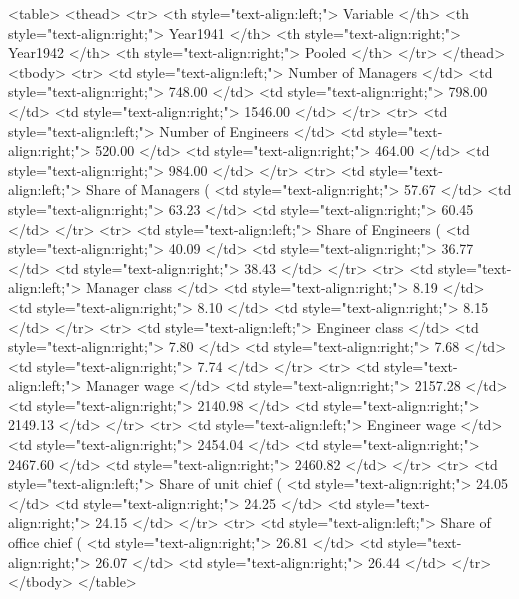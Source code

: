 <table>
 <thead>
  <tr>
   <th style="text-align:left;"> Variable </th>
   <th style="text-align:right;"> Year1941 </th>
   <th style="text-align:right;"> Year1942 </th>
   <th style="text-align:right;"> Pooled </th>
  </tr>
 </thead>
<tbody>
  <tr>
   <td style="text-align:left;"> Number of Managers </td>
   <td style="text-align:right;"> 748.00 </td>
   <td style="text-align:right;"> 798.00 </td>
   <td style="text-align:right;"> 1546.00 </td>
  </tr>
  <tr>
   <td style="text-align:left;"> Number of Engineers </td>
   <td style="text-align:right;"> 520.00 </td>
   <td style="text-align:right;"> 464.00 </td>
   <td style="text-align:right;"> 984.00 </td>
  </tr>
  <tr>
   <td style="text-align:left;"> Share of Managers (%
   <td style="text-align:right;"> 57.67 </td>
   <td style="text-align:right;"> 63.23 </td>
   <td style="text-align:right;"> 60.45 </td>
  </tr>
  <tr>
   <td style="text-align:left;"> Share of Engineers (%
   <td style="text-align:right;"> 40.09 </td>
   <td style="text-align:right;"> 36.77 </td>
   <td style="text-align:right;"> 38.43 </td>
  </tr>
  <tr>
   <td style="text-align:left;"> Manager class </td>
   <td style="text-align:right;"> 8.19 </td>
   <td style="text-align:right;"> 8.10 </td>
   <td style="text-align:right;"> 8.15 </td>
  </tr>
  <tr>
   <td style="text-align:left;"> Engineer class </td>
   <td style="text-align:right;"> 7.80 </td>
   <td style="text-align:right;"> 7.68 </td>
   <td style="text-align:right;"> 7.74 </td>
  </tr>
  <tr>
   <td style="text-align:left;"> Manager wage </td>
   <td style="text-align:right;"> 2157.28 </td>
   <td style="text-align:right;"> 2140.98 </td>
   <td style="text-align:right;"> 2149.13 </td>
  </tr>
  <tr>
   <td style="text-align:left;"> Engineer wage </td>
   <td style="text-align:right;"> 2454.04 </td>
   <td style="text-align:right;"> 2467.60 </td>
   <td style="text-align:right;"> 2460.82 </td>
  </tr>
  <tr>
   <td style="text-align:left;"> Share of unit chief (%
   <td style="text-align:right;"> 24.05 </td>
   <td style="text-align:right;"> 24.25 </td>
   <td style="text-align:right;"> 24.15 </td>
  </tr>
  <tr>
   <td style="text-align:left;"> Share of office chief (%
   <td style="text-align:right;"> 26.81 </td>
   <td style="text-align:right;"> 26.07 </td>
   <td style="text-align:right;"> 26.44 </td>
  </tr>
</tbody>
</table>
